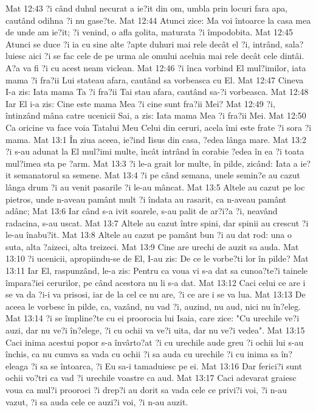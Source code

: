 Mat 12:43  ?i când duhul necurat a ie?it din om, umbla prin locuri fara apa, cautând odihna ?i nu gase?te.
Mat 12:44  Atunci zice: Ma voi întoarce la casa mea de unde am ie?it; ?i venind, o afla golita, maturata ?i împodobita.
Mat 12:45  Atunci se duce ?i ia cu sine alte ?apte duhuri mai rele decât el ?i, intrând, sala?luiesc aici ?i se fac cele de pe urma ale omului aceluia mai rele decât cele dintâi. A?a va fi ?i cu acest neam viclean.
Mat 12:46  ?i înca vorbind El mul?imilor, iata mama ?i fra?ii Lui stateau afara, cautând sa vorbeasca cu El.
Mat 12:47  Cineva I-a zis: Iata mama Ta ?i fra?ii Tai stau afara, cautând sa-?i vorbeasca.
Mat 12:48  Iar El i-a zis: Cine este mama Mea ?i cine sunt fra?ii Mei?
Mat 12:49  ?i, întinzând mâna catre ucenicii Sai, a zis: Iata mama Mea ?i fra?ii Mei.
Mat 12:50  Ca oricine va face voia Tatalui Meu Celui din ceruri, acela îmi este frate ?i sora ?i mama.
Mat 13:1  În ziua aceea, ie?ind Iisus din casa, ?edea lânga mare.
Mat 13:2  ?i s-au adunat la El mul?imi multe, încât intrând în corabie ?edea în ea ?i toata mul?imea sta pe ?arm.
Mat 13:3  ?i le-a grait lor multe, în pilde, zicând: Iata a ie?it semanatorul sa semene.
Mat 13:4  ?i pe când semana, unele semin?e au cazut lânga drum ?i au venit pasarile ?i le-au mâncat.
Mat 13:5  Altele au cazut pe loc pietros, unde n-aveau pamânt mult ?i îndata au rasarit, ca n-aveau pamânt adânc;
Mat 13:6  Iar când s-a ivit soarele, s-au palit de ar?i?a ?i, neavând radacina, s-au uscat.
Mat 13:7  Altele au cazut între spini, dar spinii au crescut ?i le-au înabu?it.
Mat 13:8  Altele au cazut pe pamânt bun ?i au dat rod: una o suta, alta ?aizeci, alta treizeci.
Mat 13:9  Cine are urechi de auzit sa auda.
Mat 13:10  ?i ucenicii, apropiindu-se de El, I-au zis: De ce le vorbe?ti lor în pilde?
Mat 13:11  Iar El, raspunzând, le-a zis: Pentru ca voua vi s-a dat sa cunoa?te?i tainele împara?iei cerurilor, pe când acestora nu li s-a dat.
Mat 13:12  Caci celui ce are i se va da ?i-i va prisosi, iar de la cel ce nu are, ?i ce are i se va lua.
Mat 13:13  De aceea le vorbesc în pilde, ca, vazând, nu vad ?i, auzind, nu aud, nici nu în?eleg.
Mat 13:14  ?i se împline?te cu ei proorocia lui Isaia, care zice: "Cu urechile ve?i auzi, dar nu ve?i în?elege, ?i cu ochii va ve?i uita, dar nu ve?i vedea".
Mat 13:15  Caci inima acestui popor s-a învârto?at ?i cu urechile aude greu ?i ochii lui s-au închis, ca nu cumva sa vada cu ochii ?i sa auda cu urechile ?i cu inima sa în?eleaga ?i sa se întoarca, ?i Eu sa-i tamaduiesc pe ei.
Mat 13:16  Dar ferici?i sunt ochii vo?tri ca vad ?i urechile voastre ca aud.
Mat 13:17  Caci adevarat graiesc voua ca mul?i prooroci ?i drep?i au dorit sa vada cele ce privi?i voi, ?i n-au vazut, ?i sa auda cele ce auzi?i voi, ?i n-au auzit.

